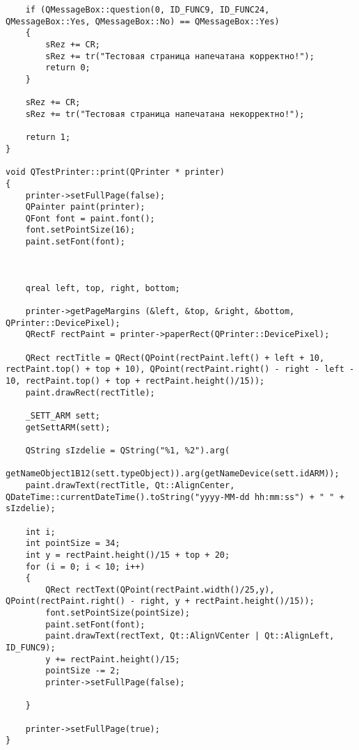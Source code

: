 \begin{verbatim}
	if (QMessageBox::question(0, ID_FUNC9, ID_FUNC24, QMessageBox::Yes, QMessageBox::No) == QMessageBox::Yes)
	{
		sRez += CR;
		sRez += tr("Тестовая страница напечатана корректно!");
		return 0;
	}

	sRez += CR;
	sRez += tr("Тестовая страница напечатана некорректно!");

	return 1;
}

void QTestPrinter::print(QPrinter * printer)
{
	printer->setFullPage(false);
	QPainter paint(printer);
	QFont font = paint.font();
	font.setPointSize(16);
	paint.setFont(font);



	qreal left, top, right, bottom;

	printer->getPageMargins (&left, &top, &right, &bottom, QPrinter::DevicePixel);
	QRectF rectPaint = printer->paperRect(QPrinter::DevicePixel);

	QRect rectTitle = QRect(QPoint(rectPaint.left() + left + 10, rectPaint.top() + top + 10), QPoint(rectPaint.right() - right - left - 10, rectPaint.top() + top + rectPaint.height()/15));
	paint.drawRect(rectTitle);

	_SETT_ARM sett;
	getSettARM(sett);

	QString sIzdelie = QString("%1, %2").arg(
			getNameObject1B12(sett.typeObject)).arg(getNameDevice(sett.idARM));
	paint.drawText(rectTitle, Qt::AlignCenter, QDateTime::currentDateTime().toString("yyyy-MM-dd hh:mm:ss") + " " + sIzdelie);

	int i;
	int pointSize = 34;
	int y = rectPaint.height()/15 + top + 20;
	for (i = 0; i < 10; i++)
	{
		QRect rectText(QPoint(rectPaint.width()/25,y), QPoint(rectPaint.right() - right, y + rectPaint.height()/15));
		font.setPointSize(pointSize);
		paint.setFont(font);
		paint.drawText(rectText, Qt::AlignVCenter | Qt::AlignLeft, ID_FUNC9);
		y += rectPaint.height()/15;
		pointSize -= 2;
		printer->setFullPage(false);

	}

	printer->setFullPage(true);
}
\end{verbatim}
\clearpage
